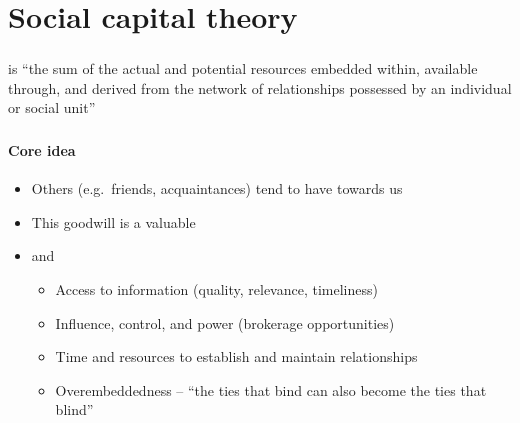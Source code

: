 \documentclass[8pt]{beamer}
\begin{document}




\section{Social capital theory}

\bgroup
{}
\begin{frame}[plain]{}
\begin{center}
\color{white}{\Huge\insertsection}
\end{center}
\end{frame}
\egroup


\begin{frame}
\frametitle{\insertsection}


{\color{blue}{Social capital}} is ``the sum of the actual and potential resources embedded within, available through, and derived from the network of relationships possessed by an individual or social unit''\\
\vspace{0.5cm}
\cite{Nahapiet1998}  

\end{frame}


\begin{frame}
\frametitle{\insertsection}
\framesubtitle{Core idea}

\begin{itemize}
\item Others (e.g.\ friends, acquaintances) tend to have {\color{blue}{goodwill}} towards us
\item This goodwill is a valuable {\color{blue}{resource}}
\item {\color{dkgreen}{Benefits}} and {\color{red}{risks}}
    \begin{itemize}
    \item Access to information (quality, relevance, timeliness)
    \item Influence, control, and power (brokerage opportunities)
    \item Time and resources to establish and maintain relationships
    \item Overembeddedness -- ``the ties that bind can also become the
ties that blind'' \cite{Powell1994}
    \end{itemize}
\end{itemize}
 

\end{frame}
\end{document}
